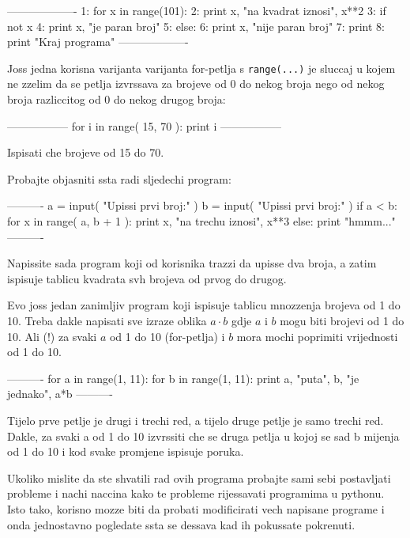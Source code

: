 -------------------
1: for x in range(101):
2: 	print x, "na kvadrat iznosi", x**2
3: 	if not x %
4: 		print x, "je paran broj"
5:		else:
6: 		print x, "nije paran broj"
7: 	print
8: print "Kraj programa"
-------------------

Joss jedna korisna varijanta varijanta for-petlja s \verb"range(...)" je
sluccaj u kojem ne zzelim da se petlja izvrssava za brojeve od 0 do nekog
broja nego od nekog broja razliccitog od 0 do nekog drugog broja:

-----------------
for i in range( 15, 70 ):
	print i
-----------------

Ispisati che brojeve od 15 do 70.

Probajte objasniti ssta radi sljedechi program:

----------
a = input( "Upissi prvi broj:" )
b = input( "Upissi prvi broj:" )
if a < b:
	for x in range( a, b + 1 ):
		print x, "na trechu iznosi", x**3
else:
	print "hmmm..."
----------

Napissite sada program koji od korisnika trazzi da upisse dva broja, a
zatim ispisuje tablicu kvadrata svh brojeva od prvog do drugog.

Evo joss jedan zanimljiv program koji ispisuje tablicu mnozzenja brojeva od
1 do 10. Treba dakle napisati sve izraze oblika $a\cdot b$ gdje $a$ i $b$
mogu biti brojevi od 1 do 10. Ali (!) za svaki $a$ od 1 do 10 (for-petlja)
i $b$ mora mochi poprimiti vrijednosti od 1 do 10.

----------
for a in range(1, 11):
	for b in range(1, 11):
		print a, "puta", b, "je jednako", a*b
----------

Tijelo prve petlje je drugi i trechi red, a tijelo druge petlje je samo
trechi red. Dakle, za svaki a od 1 do 10 izvrssiti che se druga petlja u
kojoj se sad b mijenja od 1 do 10 i kod svake promjene ispisuje poruka.

Ukoliko mislite da ste shvatili rad ovih programa probajte sami sebi
postavljati probleme i nachi naccina kako te probleme rijessavati
programima u pythonu. Isto tako, korisno mozze biti da probati modificirati
vech napisane programe i onda jednostavno pogledate ssta se dessava kad ih
pokussate pokrenuti.
